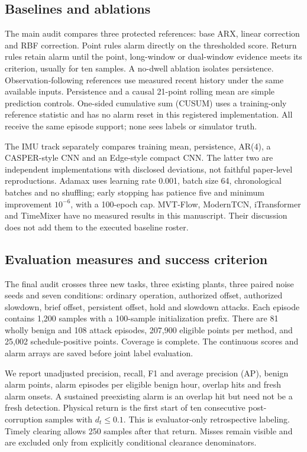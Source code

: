 \documentclass[11pt]{article}
\begin{document}
\subsection{Baselines and ablations}
The main audit compares three protected references: base ARX, linear correction and RBF correction. Point rules alarm directly on the thresholded score. Return rules retain alarm until the point, long-window or dual-window evidence meets its criterion, usually for ten samples. A no-dwell ablation isolates persistence. Observation-following references use measured recent history under the same available inputs. Persistence and a causal 21-point rolling mean are simple prediction controls. One-sided cumulative sum (CUSUM) uses a training-only reference statistic and has no alarm reset in this registered implementation. All receive the same episode support; none sees labels or simulator truth.

The IMU track separately compares training mean, persistence, AR(4), a CASPER-style CNN and an Edge-style compact CNN. The latter two are independent implementations with disclosed deviations, not faithful paper-level reproductions. Adamax uses learning rate 0.001, batch size 64, chronological batches and no shuffling; early stopping has patience five and minimum improvement $10^{-6}$, with a 100-epoch cap. MVT-Flow, ModernTCN, iTransformer and TimeMixer have no measured results in this manuscript. Their discussion does not add them to the executed baseline roster.

\subsection{Evaluation measures and success criterion}
The final audit crosses three new tasks, three existing plants, three paired noise seeds and seven conditions: ordinary operation, authorized offset, authorized slowdown, brief offset, persistent offset, hold and slowdown attacks. Each episode contains 1,200 samples with a 100-sample initialization prefix. There are 81 wholly benign and 108 attack episodes, 207,900 eligible points per method, and 25,002 schedule-positive points. Coverage is complete. The continuous scores and alarm arrays are saved before joint label evaluation.

We report unadjusted precision, recall, F1 and average precision (AP), benign alarm points, alarm episodes per eligible benign hour, overlap hits and fresh alarm onsets. A sustained preexisting alarm is an overlap hit but need not be a fresh detection. Physical return is the first start of ten consecutive post-corruption samples with $d_t\le0.1$. This is evaluator-only retrospective labeling. Timely clearing allows 250 samples after that return. Misses remain visible and are excluded only from explicitly conditional clearance denominators.
\end{document}

